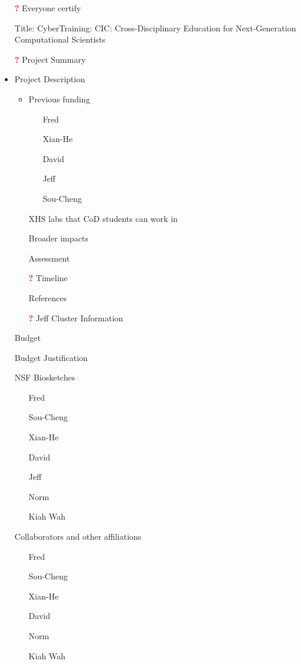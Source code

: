 \documentclass[11pt]{NSFamsart}
\newcommand{\notyet}{\textcolor{red}{\textbf{?}}}
\newcommand{\done}{\textcolor{green}{\checkmark}}
\begin{document}
\begin{itemize}
\item[\notyet] Everyone certify
\item[\done] Title: CyberTraining: CIC:  Cross-Disciplinary Education for Next-Generation Computational Scientists
\item[\notyet] Project Summary
\item Project Description
\begin{itemize}
\item Previous funding
\begin{itemize}
\item[\done] Fred
\item[\done] Xian-He
\item[\done] David
\item[\done] Jeff 
\item[\done] Sou-Cheng
\end{itemize}
\item[\done] XHS labs that CoD students can work in
\item[\done] Broader impacts
\item[\done] Assessment
\item[\notyet] Timeline
\item[\done] References
\item[\notyet] Jeff Cluster Information
\end{itemize}

\item[\done] Budget
\item[\done] Budget Justification

\item[\done] NSF Biosketches
\begin{itemize}
\item[\done] Fred
\item[\done] Sou-Cheng
\item[\done] Xian-He
\item[\done] David
\item[\done] Jeff
\item[\done] Norm
\item[\done] Kiah Wah
\end{itemize}


\item[\done] Collaborators and other affiliations
\begin{itemize}
\item[\done] Fred
\item[\done] Sou-Cheng %
\item[\done] Xian-He
\item[\done] David
\item[\done] Norm
\item[\done] Kiah Wah
\end{itemize}


\end{itemize}
\end{document}

